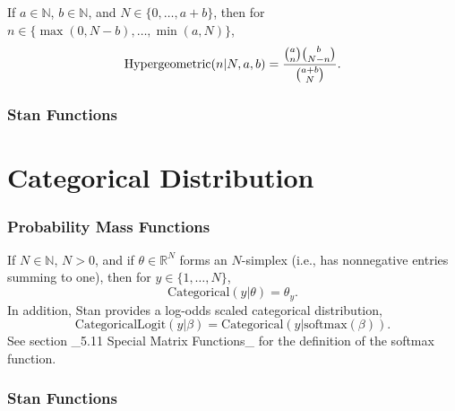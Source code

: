 \begin{description}
If $a \in \mathbb{N}$, $b \in \mathbb{N}$, and $N \in \{0,\ldots,a+b\}$, then for $n \in \{\max(0,N-b),\ldots,\min(a,N)\}$, \[ \text{Hypergeometric}(n|N,a,b) = \frac{\normalsize{\binom{a}{n} \binom{b}{N - n}}}      {\normalsize{\binom{a + b}{N}}}. \] 



\subsubsection{Stan Functions}


\begin{description}    \end{description}


\begin{description}  \end{description}


\section{Categorical Distribution}\label{categorical-distribution.section}


\subsubsection{Probability Mass Functions}


If $N \in \mathbb{N}$, $N > 0$, and if $\theta \in \mathbb{R}^N$ forms an $N$-simplex (i.e., has nonnegative entries summing to one), then for $y \in \{1,\ldots,N\}$, \[ \text{Categorical}(y|\theta) = \theta_y. \] In addition, Stan provides a log-odds scaled categorical distribution, \[ \text{CategoricalLogit}(y|\beta) = \text{Categorical}(y|\text{softmax}(\beta)). \] See section _5.11 Special Matrix Functions_ for the definition of the softmax function.


 


\subsubsection{Stan Functions}



\end{description}
